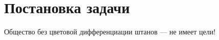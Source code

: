 \chapter{Постановка задачи}
\label{cha:goals}

Общество без цветовой дифференциации штанов — не имеет цели!

